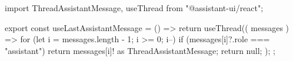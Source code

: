 import { ThreadAssistantMessage, useThread } from "@assistant-ui/react";

export const useLastAssistantMessage = () => {
  return useThread(({ messages }) => {
    for (let i = messages.length - 1; i >= 0; i--) {
      if (messages[i]?.role === "assistant") {
        return messages[i]! as ThreadAssistantMessage;
      }
    }
    return null;
  });
};